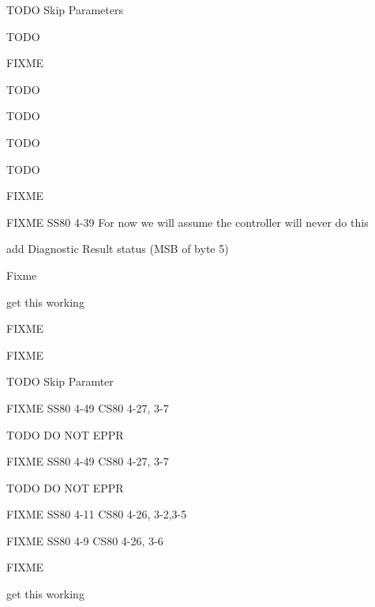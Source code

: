 \begin{DoxyRefList}
T\-O\-D\-O Skip Parameters 

T\-O\-D\-O 

F\-I\-X\-M\-E 

T\-O\-D\-O 

T\-O\-D\-O 

T\-O\-D\-O 

T\-O\-D\-O  
\item[\label{todo__todo000027}%
\hypertarget{todo__todo000027}{}%
Global \hyperlink{ss80_8h_a46587aecd8aff545fb96ef5b308f28ff}{S\-S80\-\_\-init} (void)]F\-I\-X\-M\-E  
\item[\label{todo__todo000028}%
\hypertarget{todo__todo000028}{}%
Global \hyperlink{ss80_8h_acad6de863f4566b55cb8860eb1ffd09c}{S\-S80\-\_\-locate\-\_\-and\-\_\-read} (void)]F\-I\-X\-M\-E S\-S80 4-\/39 For now we will assume the controller will never do this  
\item[\label{todo__todo000029}%
\hypertarget{todo__todo000029}{}%
Global \hyperlink{ss80_8h_ac4c1287b3b8b6a51f5b79522c62d4cea}{S\-S80\-\_\-send\-\_\-status} (void)]add Diagnostic Result status (M\-S\-B of byte 5) 

Fixme  
\item[\label{todo__todo000026}%
\hypertarget{todo__todo000026}{}%
Global \hyperlink{ss80_8h_af50a313d8234d38511925a0ca5a9a8a3}{S\-S80\-\_\-\-Test} (void)]get this working  
\item[\label{todo__todo000050}%
\hypertarget{todo__todo000050}{}%
Global \hyperlink{ss80_8h_a00d10ca5d1cb70d035927df06e90d36c}{S\-S80\-\_\-\-Transparent\-\_\-\-State} (void)]F\-I\-X\-M\-E 

F\-I\-X\-M\-E 

T\-O\-D\-O Skip Paramter 

F\-I\-X\-M\-E S\-S80 4-\/49 C\-S80 4-\/27, 3-\/7 

T\-O\-D\-O D\-O N\-O\-T E\-P\-P\-R 

F\-I\-X\-M\-E S\-S80 4-\/49 C\-S80 4-\/27, 3-\/7 

T\-O\-D\-O D\-O N\-O\-T E\-P\-P\-R 

F\-I\-X\-M\-E S\-S80 4-\/11 C\-S80 4-\/26, 3-\/2,3-\/5 

F\-I\-X\-M\-E S\-S80 4-\/9 C\-S80 4-\/26, 3-\/6  
\item[\label{todo__todo000063}%
\hypertarget{todo__todo000063}{}%
Global \hyperlink{ss80_8h_ac8a4c5dcd550e896c1e7cec68d2f70e5}{S\-S80\-\_\-\-Universal\-\_\-\-Device\-\_\-\-Clear} (void)]F\-I\-X\-M\-E  
\item[\label{todo__todo000025}%
\hypertarget{todo__todo000025}{}%
Global \hyperlink{ss80_8c_a239f4cd0f1360dbfd90fa043d1323e67}{T\-D} \mbox{[}\mbox{]}]get this working 
\end{DoxyRefList}